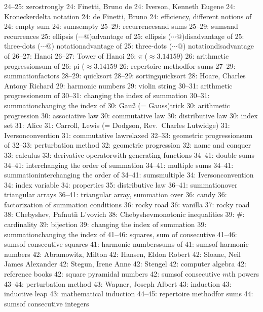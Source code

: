  24--25: zero\sub strongly
 24: Finetti, Bruno de
 24: Iverson, Kenneth Eugene
 24: Kronecker\sub delta notation
 24: de Finetti, Bruno
 24: efficiency, different notions of
 24: empty sum
 24: sums\sub empty
 25--29: recurrences\sub and sums
 25--29: sums\sub and recurrences
 25: ellipsis ($\cdots@$)\sub advantage of
 25: ellipsis ($\cdots@$)\sub disadvantage of
 25: three-dots ($\cdots@$) notation\sub advantage of
 25: three-dots ($\cdots@$) notation\sub disadvantage of
 26--27: Hanoi
 26--27: Tower of Hanoi
 26: $\pi$ ($\approx3.14159$)
 26: arithmetic progression\sub sum of
 26: pi ($\approx3.14159$
 26: repertoire method\sub for sums
 27--29: summation\sub factors
 28--29: quicksort
 28--29: sorting\sub quicksort
 28: Hoare, Charles Antony Richard
 29: harmonic numbers
 29: violin string
 30--31: arithmetic progression\sub sum of
 30--31: changing the index of summation
 30--31: summation\sub changing the index of
 30: Gau{\ss} (= Gauss)\sub trick
 30: arithmetic progression
 30: associative law
 30: commutative law
 30: distributive law
 30: index set
 31: Alice
 31: Carroll, Lewis (= Dodgson, Rev.~Charles Lutwidge)
 31: Iverson\sub convention
 31: commutative law\sub relaxed
 32--33: geometric progression\sub sum of
 32--33: perturbation method
 32: geometric progression
 32: name and conquer
 33: calculus
 33: derivative operator\sub with generating functions
 34--41: double sums
 34--41: interchanging the order of summation
 34--41: multiple sums
 34--41: summation\sub interchanging the order of
 34--41: sums\sub multiple
 34: Iverson\sub convention
 34: index variable
 34: properties
 35: distributive law
 36--41: summation\sub over triangular arrays
 36--41: triangular array, summation over
 36: candy
 36: factorization of summation conditions
 36: rocky road
 36: vanilla
 37: rocky road
 38: Chebyshev, Pafnuti{\u\i} L'vovich
 38: Chebyshev\sub monotonic inequalities
 39: $\#$: cardinality
 39: bijection
 39: changing the index of summation
 39: summation\sub changing the index of
 41--46: squares, sum of consecutive
 41--46: sums\sub of consecutive squares
 41: harmonic numbers\sub sums of
 41: sums\sub of harmonic numbers
 42: Abramowitz, Milton
 42: Hansen, Eldon Robert
 42: Sloane, Neil James Alexander
 42: Stegun, Irene Anne
 42: Stengel
 42: computer algebra
 42: reference books
 42: square pyramidal numbers
 42: sums\sub of consecutive $m$th powers
 43--44: perturbation method
 43: Wapner, Joseph Albert
 43: induction
 43: inductive leap
 43: mathematical induction
 44--45: repertoire method\sub for sums
 44: sums\sub of consecutive integers
